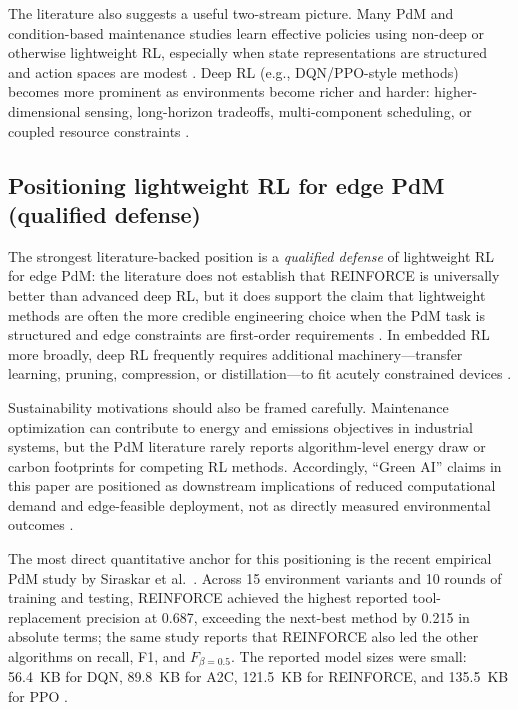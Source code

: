 \documentclass[sn-basic]{sn-jnl} %
\begin{document}
The literature also suggests a useful two-stream picture. Many PdM and condition-based maintenance studies learn effective policies using non-deep or otherwise lightweight RL, especially when state representations are structured and action spaces are modest \cite{Adsule2020, Yousefi2020, Rasay2024, Dadash2024}. Deep RL (e.g., DQN/PPO-style methods) becomes more prominent as environments become richer and harder: higher-dimensional sensing, long-horizon tradeoffs, multi-component scheduling, or coupled resource constraints \cite{Liu2020, Chen2023, Lee2022, Ong2022-02}.

\subsection{Positioning lightweight RL for edge PdM (qualified defense)}
The strongest literature-backed position is a \emph{qualified defense} of lightweight RL for edge PdM: the literature does not establish that REINFORCE is universally better than advanced deep RL, but it does support the claim that lightweight methods are often the more credible engineering choice when the PdM task is structured and edge constraints are first-order requirements \cite{Compare2020, Njor2024, Pandey2023}. In embedded RL more broadly, deep RL frequently requires additional machinery---transfer learning, pruning, compression, or distillation---to fit acutely constrained devices \cite{Jang2020, Szydlo2022, Xu2022}.

Sustainability motivations should also be framed carefully. Maintenance optimization can contribute to energy and emissions objectives in industrial systems, but the PdM literature rarely reports algorithm-level energy draw or carbon footprints for competing RL methods. Accordingly, ``Green AI'' claims in this paper are positioned as downstream implications of reduced computational demand and edge-feasible deployment, not as directly measured environmental outcomes \cite{Banyai2021, Banyai2022, JasiulewiczKaczmarek2024}.

The most direct quantitative anchor for this positioning is the recent empirical PdM study by Siraskar et al.~\cite{Siraskar2025}. Across 15 environment variants and 10 rounds of training and testing, REINFORCE achieved the highest reported tool-replacement precision at 0.687, exceeding the next-best method by 0.215 in absolute terms; the same study reports that REINFORCE also led the other algorithms on recall, F1, and $F_{\beta=0.5}$. The reported model sizes were small: 56.4~KB for DQN, 89.8~KB for A2C, 121.5~KB for REINFORCE, and 135.5~KB for PPO \cite{Siraskar2025}.
\end{document}
